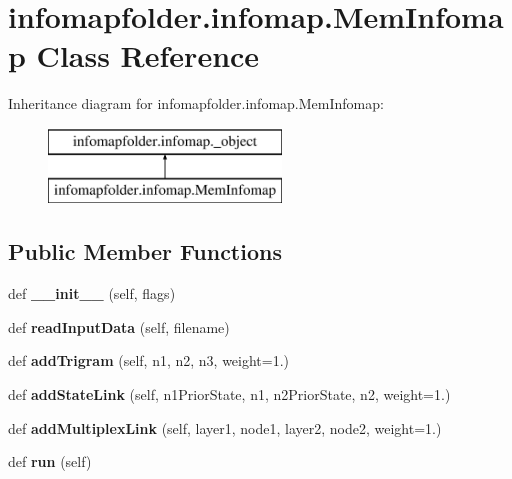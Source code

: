 \hypertarget{classinfomapfolder_1_1infomap_1_1MemInfomap}{}\section{infomapfolder.\+infomap.\+Mem\+Infomap Class Reference}
\label{classinfomapfolder_1_1infomap_1_1MemInfomap}
Inheritance diagram for infomapfolder.\+infomap.\+Mem\+Infomap\+:\begin{figure}[H]
\begin{center}
\leavevmode
\includegraphics[height=2.000000cm]{classinfomapfolder_1_1infomap_1_1MemInfomap}
\end{center}
\end{figure}
\subsection*{Public Member Functions}
\begin{DoxyCompactItemize}
\item 
\mbox{\label{classinfomapfolder_1_1infomap_1_1MemInfomap_a9d75e9310126f29940a1f4eeda890a75}} 
def {\bfseries \+\_\+\+\_\+init\+\_\+\+\_\+} (self, flags)
\item 
\mbox{\label{classinfomapfolder_1_1infomap_1_1MemInfomap_ab0e2c6bd574f1ef5a4f2bf98f855deda}} 
def {\bfseries read\+Input\+Data} (self, filename)
\item 
\mbox{\label{classinfomapfolder_1_1infomap_1_1MemInfomap_a275667309a5c7d8ea15aee58e4be65fa}} 
def {\bfseries add\+Trigram} (self, n1, n2, n3, weight=1.)
\item 
\mbox{\label{classinfomapfolder_1_1infomap_1_1MemInfomap_ab3ca9663dd77df1e41321ebe2426219d}} 
def {\bfseries add\+State\+Link} (self, n1\+Prior\+State, n1, n2\+Prior\+State, n2, weight=1.)
\item 
\mbox{\label{classinfomapfolder_1_1infomap_1_1MemInfomap_a7501bb20663c8fe9d3afa058704804d6}} 
def {\bfseries add\+Multiplex\+Link} (self, layer1, node1, layer2, node2, weight=1.)
\item 
\mbox{\label{classinfomapfolder_1_1infomap_1_1MemInfomap_a391ac3c99cb90ca5ecf0bfc4dda87faf}} 
def {\bfseries run} (self)
\end{DoxyCompactItemize}
